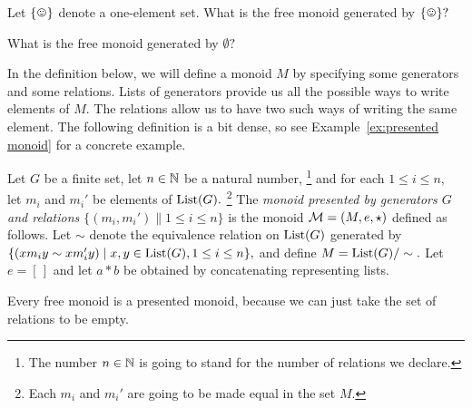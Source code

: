 \documentclass[CT4S-EN-RU]{subfiles}
\begin{document}
\begin{definitionRUS}\label{def:free monoid}
\end{definitionRUS}

\begin{exerciseENG}
Let $\singleton$ denote a one-element set.
\sexc What is the free monoid generated by $\singleton?$
\item What is the free monoid generated by $\emptyset?$
\endsexc
\end{exerciseENG}

\begin{exerciseRUS}
\end{exerciseRUS}

\begin{blockENG}
In the definition below, we will define a monoid $M$  by specifying some generators and some relations. Lists of generators provide us all the possible ways to write elements of $M.$ The relations allow us to have two such ways of writing the same element. The following definition is a bit dense, so see Example~\ref{ex:presented monoid} for a concrete example.
\end{blockENG}

\begin{blockRUS}
\end{blockRUS}

\begin{definitionENG}\label{def:presented monoid}
Let $G$ be a finite set, let $n\in{\mathbb N}$ be a natural number,
\footnote{The number $n\in{\mathbb N}$ is going to stand for the number of relations we declare.}
and for each $1\leq i\leq n,$ let $m_i$ and $m_i'$ be elements of $\textnormal{List}(G).$
\footnote{Each $m_i$ and $m_i'$ are going to be made equal in the set $M.$}
The {\em monoid presented by generators $G$ and relations $\{(m_i,m_i')\|1\leq i\leq n\}$} is the monoid $\mathcal{M}=(M,e,\star)$ defined as follows. Let $\sim$ denote the equivalence relation on $\textnormal{List}(G)$ generated by $\{(xm_iy\sim xm_i'y){\;|\;}x,y\in\textnormal{List}(G), 1\leq i\leq n\},$ and define $M=\textnormal{List}(G)/\sim.$ Let $e=[\,]$ and let $a * b$ be obtained by concatenating representing lists.
\end{definitionENG}

\begin{definitionRUS}\label{def:presented monoid}
\end{definitionRUS}

\begin{remarkENG}
Every free monoid is a presented monoid, because we can just take the set of relations to be empty.
\end{remarkENG}
\end{document}
